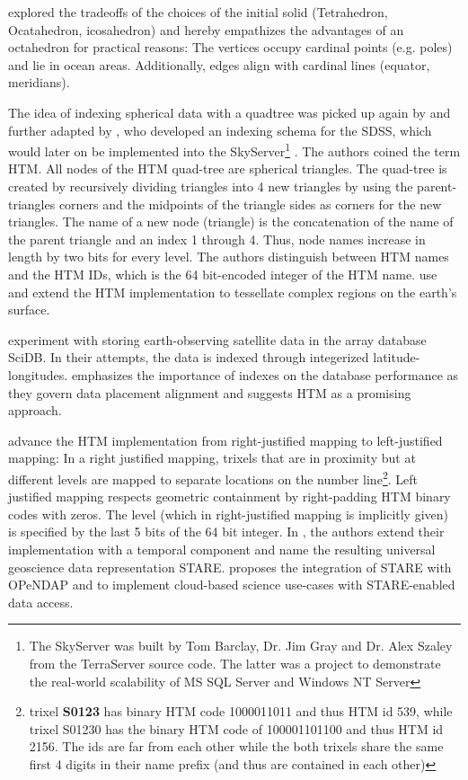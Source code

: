 \documentclass[a4paper,10pt]{article}
\begin{document}
\cite{Dutton1996} explored the tradeoffs of the choices of the initial solid (Tetrahedron, Ocatahedron, icosahedron) and hereby empathizes the advantages of an octahedron for practical reasons: The vertices occupy cardinal points (e.g. poles) and lie in ocean areas. Additionally, edges align with cardinal lines (equator, meridians).

The idea of indexing spherical data with a quadtree was picked up again by \citep{Barret1995} and further adapted by \citep{Kunszt2000, Kunszt2001, Szalay2005}, who developed an indexing schema for the \gls{SDSS}, which would later on be implemented into the SkyServer\footnote{The SkyServer was built by Tom Barclay, Dr. Jim Gray and Dr. Alex Szaley from the TerraServer \citep{Barclay1998, Slutz1999} source code. The latter was a project to demonstrate the real-world scalability of MS SQL Server and Windows NT Server} \citep{Szalay2002, Thakar2003}.
The authors coined the term \gls{HTM}.
All nodes of the HTM quad-tree are spherical triangles. The quad-tree is created by recursively dividing triangles into 4 new triangles by using the parent-triangles corners and the midpoints of the triangle sides as corners for the new triangles.
The name of a new node (triangle) is the concatenation of the name of the parent triangle and an index 1 through 4. Thus, node names increase in length by two bits for every level. The authors distinguish between HTM names and the HTM IDs, which is the 64 bit-encoded integer of the HTM name. 
\citep{Kondor2014} use and extend the HTM implementation to tessellate complex regions on the earth's surface.

\citep{Planthaber2012, Planthaber2012b, Krcal2015, Hausen2016, Doan2016} experiment with storing earth-observing satellite data in the array database SciDB. In their attempts, the data is indexed through integerized latitude-longitudes. \citep{Doan2016} emphasizes the importance of indexes on the database performance as they govern data placement alignment and suggests \gls{HTM} as a promising approach.

\citep{Rilee2016} advance the HTM implementation from right-justified mapping to left-justified mapping:
In a right justified mapping, trixels that are in proximity but at different levels are mapped to separate locations on the number line\footnote{trixel \textbf{S0123} has binary HTM code 1000011011 and thus HTM id 539, while trixel S01230 has the binary HTM code of 100001101100 and thus HTM id 2156. The ids are far from each other while the both trixels share the same first 4 digits in their name prefix (and thus are contained in each other)}.
Left justified mapping respects geometric containment by right-padding HTM binary codes with zeros.
The level (which in right-justified mapping is implicitly given) is specified by the last 5 bits of the 64 bit integer.
In \citep{Kuo2017}, the authors extend their implementation with a temporal component and name the resulting universal geoscience data representation \gls{STARE}.
\citep{Rilee2018} proposes the integration of \gls{STARE} with \gls{OPeNDAP} and to implement cloud-based science use-cases with STARE-enabled data access.
\end{document}
